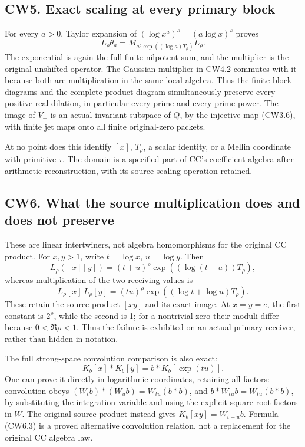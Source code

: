 \subsection{CW5. Exact scaling at every primary
block}\label{cw5.-exact-scaling-at-every-primary-block}

For every \(a>0\), Taylor expansion of \((\log x^a)^s=(a\log x)^s\)
proves \[
L_\rho\theta_a
=M_{a^\rho\exp((\log a)T_\rho)}L_\rho.
\tag{CW5.1}
\] The exponential is again the full finite nilpotent sum, and the
multiplier is the original unshifted operator. The Gaussian multiplier
in CW4.2 commutes with it because both are multiplication in the same
local algebra. Thus the finite-block diagrams and the complete-product
diagram simultaneously preserve every positive-real dilation, in
particular every prime and every prime power. The image of \(V_+\) is an
actual invariant subspace of \(Q\), by the injective map (CW3.6), with
finite jet maps onto all finite original-zero packets.

At no point does this identify \([x]\), \(T_\rho\), a scalar identity,
or a Mellin coordinate with primitive \(\tau\). The domain is a
specified part of CC's coefficient algebra after arithmetic
reconstruction, with its source scaling operation retained.

\subsection{CW6. What the source multiplication does and does not
preserve}\label{cw6.-what-the-source-multiplication-does-and-does-not-preserve}

These are linear intertwiners, not algebra homomorphisms for the
original CC product. For \(x,y>1\), write \(t=\log x\), \(u=\log y\).
Then \[
L_\rho([x][y])=(t+u)^\rho
\exp((\log(t+u))T_\rho),
\tag{CW6.1}
\] whereas multiplication of the two receiving values is \[
L_\rho[x]\,L_\rho[y]=(tu)^\rho
\exp((\log t+\log u)T_\rho).
\tag{CW6.2}
\] These retain the source product \([xy]\) and its exact image. At
\(x=y=e\), the first constant is \(2^\rho\), while the second is 1; for
a nontrivial zero their moduli differ because \(0<\Re\rho<1\). Thus the
failure is exhibited on an actual primary receiver, rather than hidden
in notation.

The full strong-space convolution comparison is also exact: \[
K_b[x]*K_b[y]=b*K_b[\exp(tu)].
\tag{CW6.3}
\] One can prove it directly in logarithmic coordinates, retaining all
factors: convolution obeys \((W_t b)*(W_u b)=W_{tu}(b*b)\), and
\(b*W_{tu}b=W_{tu}(b*b)\), by substituting the integration variable and
using the explicit square-root factors in \(W\). The original source
product instead gives \(K_b[xy]=W_{t+u}b\). Formula (CW6.3) is a proved
alternative convolution relation, not a replacement for the original CC
algebra law.

